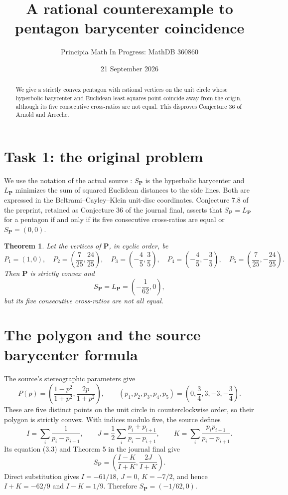 \documentclass[11pt]{article}
\title{A rational counterexample to pentagon barycenter coincidence}
\author{Principia Math In Progress: MathDB 360860}
\date{21 September 2026}
\newtheorem{theorem}{Theorem}
\begin{document}
\maketitle
\begin{abstract}
We give a strictly convex pentagon with rational vertices on the unit circle
whose hyperbolic barycenter and Euclidean least-squares point coincide away
from the origin, although its five consecutive cross-ratios are not equal.
This disproves Conjecture 36 of Arnold and Arreche.
\end{abstract}

\section*{Task 1: the original problem}
We use the notation of the actual source \cite{AA}: $S_{\mathbf P}$ is the
hyperbolic barycenter and $L_{\mathbf P}$ minimizes the sum of squared
Euclidean distances to the side lines. Both are expressed in the
Beltrami--Cayley--Klein unit-disc coordinates. Conjecture 7.8 of the preprint,
retained as Conjecture 36 of the journal final, asserts that
$S_{\mathbf P}=L_{\mathbf P}$ for a pentagon if and only if its five
consecutive cross-ratios are equal or $S_{\mathbf P}=(0,0)$.

\begin{theorem}
Let the vertices of $\mathbf P$, in cyclic order, be
\[
 P_1=(1,0),\quad P_2=\left(\frac7{25},\frac{24}{25}\right),\quad
 P_3=\left(-\frac45,\frac35\right),\quad
 P_4=\left(-\frac45,-\frac35\right),\quad
 P_5=\left(\frac7{25},-\frac{24}{25}\right).
\]
Then $\mathbf P$ is strictly convex and
\[
                     S_{\mathbf P}=L_{\mathbf P}
                        =\left(-\frac1{62},0\right),
\]
but its five consecutive cross-ratios are not all equal.
\end{theorem}

\section*{The polygon and the source barycenter formula}
The source's stereographic parameters give
\[
 P(p)=\left(\frac{1-p^2}{1+p^2},\frac{2p}{1+p^2}\right),\qquad
 (p_1,p_2,p_3,p_4,p_5)=\left(0,\frac34,3,-3,-\frac34\right).
\]
These are five distinct points on the unit circle in counterclockwise order,
so their polygon is strictly convex. With indices modulo five, the source
defines
\[
 I=\sum_i\frac1{p_i-p_{i+1}},\qquad
 J=\frac12\sum_i\frac{p_i+p_{i+1}}{p_i-p_{i+1}},\qquad
 K=\sum_i\frac{p_ip_{i+1}}{p_i-p_{i+1}}.
\]
Its equation (3.3) and Theorem 5 in the journal final give
\[
 S_{\mathbf P}=\left(\frac{I-K}{I+K},\frac{2J}{I+K}\right).
\]
Direct substitution gives $I=-61/18$, $J=0$, $K=-7/2$, and hence
$I+K=-62/9$ and $I-K=1/9$. Therefore $S_{\mathbf P}=(-1/62,0)$.
\end{document}

